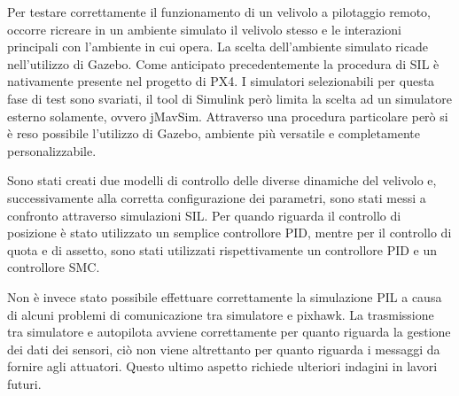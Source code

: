 Per testare correttamente il funzionamento di un velivolo a pilotaggio remoto, occorre ricreare in un ambiente simulato il velivolo stesso e le interazioni principali con l'ambiente in cui opera. La scelta dell'ambiente simulato ricade nell'utilizzo di Gazebo. Come anticipato precedentemente la procedura di SIL è nativamente presente nel progetto di PX4. I simulatori selezionabili per questa fase di test sono svariati, il tool di Simulink però limita la scelta ad un simulatore esterno solamente, ovvero jMavSim. Attraverso una procedura particolare però si è reso possibile l'utilizzo di Gazebo, ambiente più versatile e completamente personalizzabile.

Sono stati creati due modelli di controllo delle diverse dinamiche del velivolo e, successivamente alla corretta configurazione dei parametri, sono stati messi a confronto attraverso simulazioni SIL. Per quando riguarda il controllo di posizione è stato utilizzato un semplice controllore PID, mentre per il controllo di quota e di assetto, sono stati utilizzati rispettivamente un controllore PID e un controllore SMC. 

Non è invece stato possibile effettuare correttamente la simulazione PIL a causa di alcuni problemi di comunicazione tra simulatore e pixhawk. La trasmissione tra simulatore e autopilota avviene correttamente per quanto riguarda la gestione dei dati dei sensori, ciò non viene altrettanto per quanto riguarda i messaggi da fornire agli attuatori. Questo ultimo aspetto richiede ulteriori indagini in lavori futuri.